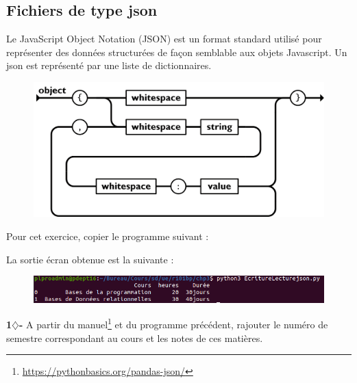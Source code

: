 \subsection{Fichiers de type json }




\begin{tcolorbox}[lefttitle=2cm, colframe=gray!50!yellow, title= \textbf{ JSON}]
Le JavaScript Object Notation (JSON) est un format standard utilisé pour représenter des données structurées de façon semblable aux objets Javascript.
Un json est représenté par une liste de dictionnaires.

\begin{figure}[H]
    \centering
    \includegraphics[scale = 0.5]{chapitre3/figures/jsonImg.png}
\end{figure}

\end{tcolorbox}


Pour cet exercice, copier le programme suivant : 


La sortie écran obtenue est la suivante : 

\begin{figure}[H]
    \centering
    \includegraphics[scale = 0.5]{chapitre3/figures/json.png}
\end{figure}

\begin{tcolorbox}[lefttitle=2cm, colframe=gray!75!black, title= \textbf{Exercice}]
\textbf{1$\diamondsuit$-}
A partir du manuel\footnote{\url{https://pythonbasics.org/pandas-json/}} et du programme précédent, rajouter le numéro de semestre correspondant au cours et les notes de ces matières.

\end{tcolorbox}


